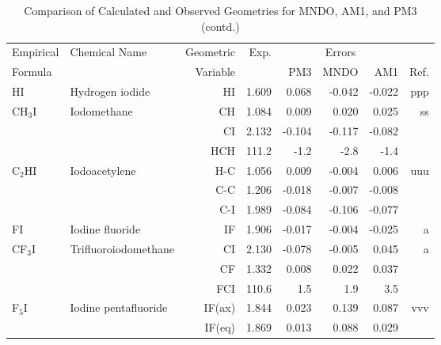 \begin{table}
\caption{\label{geotabm}Comparison of Calculated and Observed Geometries for 
MNDO, AM1, and PM3 (contd.)}
\begin{center}
\compresstable
\begin{tabular}{llrrrrrr}
 Empirical  & Chemical Name &  Geometric &  Exp. & \multicolumn{3}{c}{Errors} & \\
  Formula   &               &  Variable &        & PM3  & MNDO  &  AM1 & Ref.\\
\hline
 HI          & Hydrogen iodide                    &HI            &     1.609   &     0.068 &    -0.042 &    -0.022 &   ppp \\
 CH$_3$I        & Iodomethane                        &CH            &     1.084   &     0.009 &     0.020 &     0.025 &    ss \\
             &                                    &CI            &     2.132   &    -0.104 &    -0.117 &    -0.082 &       \\
             &                                    &HCH         &     111.2   &      -1.2 &      -2.8 &      -1.4   &       \\
 C$_2$HI        & Iodoacetylene                      &H-C           &     1.056   &     0.009 &    -0.004 &     0.006 &   uuu \\
             &                                    &C-C           &     1.206   &    -0.018 &    -0.007 &    -0.008 &       \\
             &                                    &C-I           &     1.989   &    -0.084 &    -0.106 &    -0.077 &       \\
 FI          & Iodine fluoride                    &IF            &     1.906   &    -0.017 &    -0.004 &    -0.025 &     a \\
 CF$_3$I        & Trifluoroiodomethane               &CI            &     2.130   &    -0.078 &    -0.005 &     0.045 &     a \\
             &                                    &CF            &     1.332   &     0.008 &     0.022 &     0.037 &       \\
             &                                    &FCI         &     110.6   &       1.5 &       1.9 &       3.5   &       \\
 F$_5$I         & Iodine pentafluoride               &IF(ax)        &     1.844   &     0.023 &     0.139 &     0.087 &   vvv \\
             &                                    &IF(eq)        &     1.869   &     0.013 &     0.088 &     0.029 &       \\

\end{tabular}
\end{center}
\end{table}
